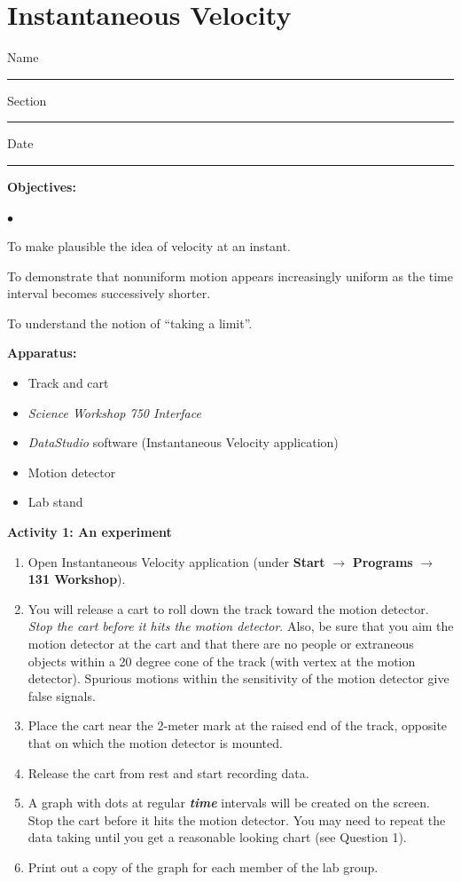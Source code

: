 
\section{Instantaneous Velocity}

Name \rule{2.0in}{0.1pt}\hfill{}Section \rule{1.0in}{0.1pt}\hfill{}Date \rule{1.0in}{0.1pt}

{\noindent \bf Objectives:} \begin{list}{$\bullet$}{\itemsep0pt }

\item To make plausible the idea of velocity at an instant. \item To demonstrate that nonuniform motion appears increasingly uniform as the time interval becomes successively shorter. \item To understand the notion of ``taking a limit''.

\end{list}

\textbf{Apparatus:}

\begin{itemize}
\item Track and cart 
\item \textit{Science Workshop 750 Interface}
\item \textit{DataStudio} software (Instantaneous Velocity application)
\item Motion detector
\item Lab stand
\end{itemize}
{\noindent \bf Activity 1: An experiment} \begin{enumerate}

\item Open Instantaneous Velocity application (under
\textbf{Start} $\rightarrow$
\textbf{Programs} $\rightarrow$ \textbf{131 Workshop}).

\item You will release a cart to roll down the track toward the motion
detector. {\it Stop the cart before it hits the motion detector}. Also, be sure
that you aim the motion detector at the cart and that there are no people or
extraneous objects within a 20 degree cone of the track (with vertex
at the motion detector). Spurious motions within the sensitivity of
the motion detector give false signals.

\item Place the cart near the 2-meter mark at the raised end of the track, opposite that on which the motion detector is mounted.

\item Release the cart from rest and start recording data.

\item A graph with dots at regular {\bf \it time} intervals will be created on the screen. Stop the cart before it hits the motion detector. You may need to repeat the data taking until you get a reasonable looking chart (see Question 1).

\item Print out a copy of the graph for each member of the lab group.

\end{enumerate}

